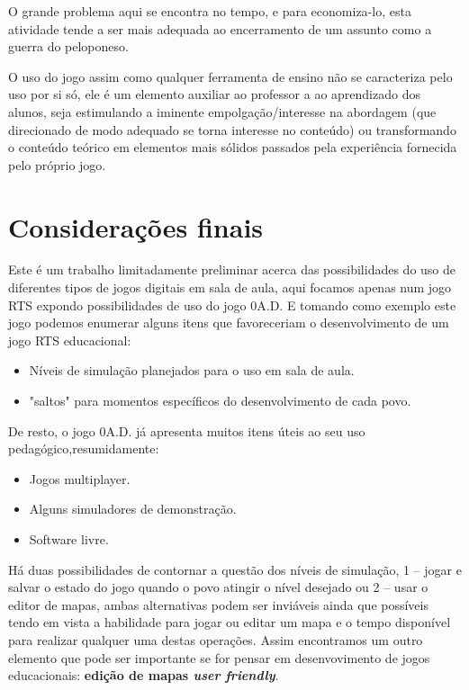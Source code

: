 \documentclass[article,11pt, a4paper,sumario=tradicional]{abntex2}
\begin{document}
    O grande problema aqui se encontra no tempo, e para economiza-lo, esta atividade tende a ser mais adequada ao encerramento de um assunto como a guerra do peloponeso.

\vskip 15pt
 
	    O uso do jogo assim como qualquer ferramenta de ensino não se caracteriza pelo uso por si só, ele é um elemento auxiliar ao professor a ao aprendizado dos alunos, seja estimulando a iminente empolgação/interesse na abordagem (que direcionado de modo adequado se torna interesse no conteúdo) ou transformando o conteúdo teórico em elementos mais sólidos passados pela experiência fornecida pelo próprio jogo.

\section{Considerações finais}
	Este é um trabalho limitadamente preliminar acerca das possibilidades do uso de diferentes tipos de jogos digitais em sala de aula, aqui focamos apenas num jogo RTS expondo possibilidades de uso do jogo 0A.D. E tomando como exemplo este jogo podemos enumerar alguns itens que favoreceriam o desenvolvimento de um jogo RTS educacional:
	
	\begin{itemize}
		\item Níveis de simulação planejados para o uso em sala de aula.
		\item "saltos" para momentos específicos do desenvolvimento de cada povo.
	\end{itemize}
	
	De resto, o jogo 0A.D. já apresenta muitos itens úteis ao seu uso pedagógico,resumidamente:
	
	\begin{itemize}
		\item Jogos multiplayer.
		\item Alguns simuladores de demonstração.
		\item Software livre.
	\end{itemize}
	
	Há duas possibilidades de contornar a questão dos níveis de simulação, 1 -- jogar e salvar o estado do jogo quando o povo atingir o nível desejado ou 2 -- usar o editor de mapas, ambas alternativas podem ser inviáveis ainda que possíveis tendo em vista a habilidade para jogar ou editar um mapa e o tempo disponível para realizar qualquer uma destas operações. Assim encontramos um outro elemento que pode ser importante se for pensar em desenvovimento de jogos educacionais: \textbf{edição de mapas \textit{user friendly}}.
    
\end{document}
